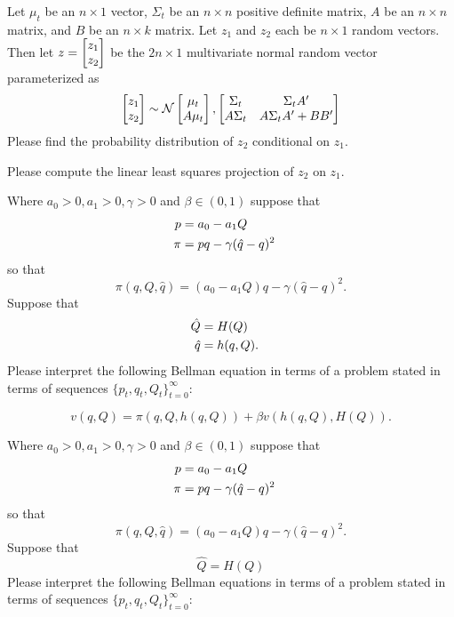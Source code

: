 \documentclass{article} %
\begin{document}
\medskip
{} \quad 
Let $\mu_t$ be an $n \times 1$ vector, $\Sigma_t$ be an $n \times n$ positive definite matrix,  
$A$ be an $n \times n$ matrix, and $B$ be an $n \times k$ matrix.
Let $z_1$ and $z_2$ each be $n \times 1$ random vectors. Then let  $z = \begin{bmatrix} z_1 \cr z_2 \end{bmatrix}$
 be the $2n \times 1$
  multivariate normal random vector
parameterized as
$$ \begin{bmatrix}z_1 \cr z_2 \end{bmatrix} \sim {\cal N} \begin{bmatrix} \mu_t \cr A \mu_t \end{bmatrix},
 \begin{bmatrix}\Sigma_t & \Sigma_t A' \cr
         A \Sigma_t & A \Sigma_t A' + B B' \end{bmatrix} $$
\medskip
{}
Please find the probability distribution of $z_2$ conditional on $z_1$.

\medskip
{} Please compute the linear least squares projection of $z_2$ on $z_1$.


\medskip

 \quad  Where $a_0 >0, a_1> 0, \gamma > 0$ and $\beta \in (0,1)$ suppose that
\begin{align*} p & = a_0 - a_1 Q \cr
           \pi &  = p q - \gamma(\hat q - q)^2 \end{align*}
so that
$$ \pi(q, Q, \hat q) = (a_0 - a_1 Q)  q - \gamma (\hat q - q)^2 .$$
Suppose that
 \begin{align*} \hat Q & = H(Q) \cr
            \hat q & = h(q, Q) . \end{align*}
Please interpret the following Bellman equation in terms of a problem stated in terms of sequences  $\{p_t, q_t, Q_t\}_{t=0}^\infty$:

$$ v(q, Q) = \pi(q,Q, h(q,Q)) + \beta v\left(h(q,Q), H(Q)\right) .$$

\medskip


 \quad Where $a_0 >0, a_1> 0, \gamma > 0$ and $\beta \in (0,1)$ suppose that
\begin{align*} p & = a_0 - a_1 Q \cr
           \pi &  = p q - \gamma(\hat q - q)^2 \end{align*}
so that
$$ \pi(q, Q, \hat q) = (a_0 - a_1 Q) q - \gamma (\hat q - q)^2 .$$
Suppose that
$$ \hat Q  = H(Q)  $$
Please interpret the following Bellman equations in terms of a problem stated in terms of sequences  $\{p_t, q_t, Q_t\}_{t=0}^\infty$:
\end{document}
